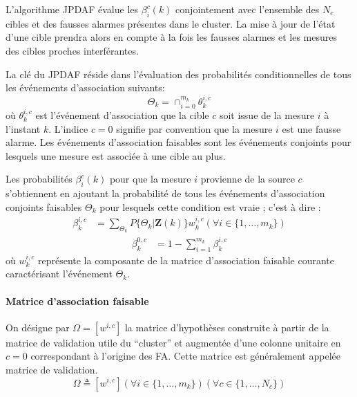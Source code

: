 \documentclass[10pt,french,a4paper]{report}
\begin{document}
				L'algorithme \ac{JPDAF} évalue les $\beta_i^c(k)$ 
 conjointement avec l'ensemble des $N_c$ cibles et des fausses
alarmes présentes dans le cluster. La mise à jour de l'état d'une cible prendra alors en compte à la fois les fausses alarmes et les mesures des cibles proches interférantes.
					
					La clé du \ac{JPDAF} réside dans l'évaluation des probabilités conditionnelles de tous
les événements d'association suivants:
 		 		 \begin{equation}
 \Theta_k = \cap_{i=0}^{m_k}\theta_k^{i,c}
	 \end{equation}		
	 où $\theta_k^{i,c}$ est l'événement d'association que la cible $c$ soit issue de la mesure $i$ à l'instant $k$. L'indice $c = 0$ signifie par convention que la mesure $i$ est une fausse alarme. Les événements d'association faisables sont les événements conjoints
pour lesquels une mesure est associée à une cible au plus.

Les probabilités $\beta_i^c(k)$ pour que la mesure $i$ provienne de la source $c$ s'obtiennent en ajoutant la probabilité de tous les événements d'association conjoints faisables  $\Theta_k$ pour lesquels cette condition est vraie ; c'est à dire :
 		 		 \begin{equation}
 		 		 \label{eq:probaAssociationCible}
 \begin{aligned}
 \beta_k^{i,c} & = \sum_{\Theta_k}P\{\Theta_k|\mathbf{Z}(k)\}w_k^{i,c} (\forall i \in \{1,\ldots,m_k\})
  \end{aligned}
	 \end{equation}	
  		 		 \begin{equation}
  		 		  \label{eq:probaAssociationFa}
 \begin{aligned}
 \beta_k^{0,c} &= 1 - \sum_{i=1}^{m_k}  \beta_k^{i,c}
 \end{aligned}
	 \end{equation}		
	 où $w_k^{i,c}$ représente la composante de la matrice d'association faisable courante caractérisant l'événement $\Theta_k$. 
\paragraph{Matrice d'association faisable}
On désigne par $\Omega=   [w^{i,c}]$ la matrice d'hypothèses construite à partir de la matrice de validation utile
du ``cluster'' et augmentée d'une colonne unitaire en $c = 0$ correspondant à l'origine des FA. Cette matrice  est généralement appelée matrice de validation.
 \begin{equation}
 \Omega \triangleq   [w^{i,c}] (\forall i \in \{1,\ldots,m_k\})(\forall c \in \{1,\ldots,N_c\})
	 \end{equation}	
	 
\end{document}
